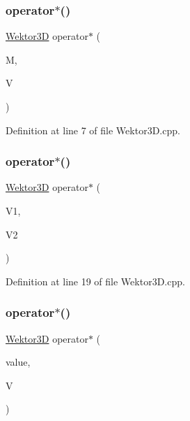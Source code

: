 \subsubsection{\texorpdfstring{operator$\ast$()}{operator*()}\hspace{0.1cm}{\footnotesize\ttfamily [1/3]}}
{\footnotesize\ttfamily \hyperlink{_wektor3_d_8hh_ac353a272b38b4ad342f7181ad7bdb91a}{Wektor3D} operator$\ast$ (\begin{DoxyParamCaption}\item[{\hyperlink{_macierz3x3_8hh_ad4fc7b0e263d9a99ba6174f68b52ea87}{Macierz3x3}}]{M,  }\item[{\hyperlink{_wektor3_d_8hh_ac353a272b38b4ad342f7181ad7bdb91a}{Wektor3D}}]{V }\end{DoxyParamCaption})}



Definition at line 7 of file Wektor3\+D.\+cpp.

\mbox{\label{_wektor3_d_8hh_a11c35b770aab1dd49984861ed1d351d4}} 
\subsubsection{\texorpdfstring{operator$\ast$()}{operator*()}\hspace{0.1cm}{\footnotesize\ttfamily [2/3]}}
{\footnotesize\ttfamily \hyperlink{_wektor3_d_8hh_ac353a272b38b4ad342f7181ad7bdb91a}{Wektor3D} operator$\ast$ (\begin{DoxyParamCaption}\item[{\hyperlink{_wektor3_d_8hh_ac353a272b38b4ad342f7181ad7bdb91a}{Wektor3D}}]{V1,  }\item[{\hyperlink{_wektor3_d_8hh_ac353a272b38b4ad342f7181ad7bdb91a}{Wektor3D}}]{V2 }\end{DoxyParamCaption})}



Definition at line 19 of file Wektor3\+D.\+cpp.

\mbox{\label{_wektor3_d_8hh_a13099aac77d6145b462434c84f6b8509}} 
\subsubsection{\texorpdfstring{operator$\ast$()}{operator*()}\hspace{0.1cm}{\footnotesize\ttfamily [3/3]}}
{\footnotesize\ttfamily \hyperlink{_wektor3_d_8hh_ac353a272b38b4ad342f7181ad7bdb91a}{Wektor3D} operator$\ast$ (\begin{DoxyParamCaption}\item[{double}]{value,  }\item[{\hyperlink{_wektor3_d_8hh_ac353a272b38b4ad342f7181ad7bdb91a}{Wektor3D}}]{V }\end{DoxyParamCaption})}



